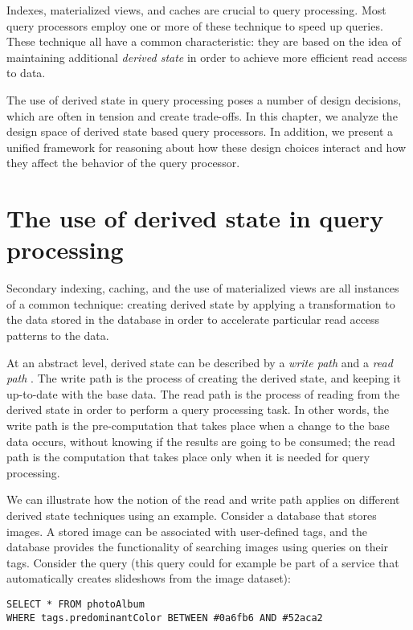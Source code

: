 Indexes, materialized views, and caches are crucial to query processing.
Most query processors employ one or more of these technique to speed up queries.
These technique all have a common characteristic:
they are based on the idea of maintaining additional \textit{derived state} in order to achieve more efficient read
access to data.

The use of derived state in query processing poses a number of design decisions,
which are often in tension and create trade-offs.
In this chapter, we analyze the design space of derived state based query processors.
In addition, we present a unified framework for reasoning about how these design choices interact
and how they affect the behavior of the query processor.


\section{The use of derived state in query processing}
\label{sec:read_write_path}

Secondary indexing, caching, and the use of materialized views are all instances of a common technique:
creating derived state by applying a transformation to the data stored in the database in order to accelerate particular
read access patterns to the data.

At an abstract level, derived state can be described by a \textit{write path} and a \textit{read path}
\cite{kleppmann:designing}.
The write path is the process of creating the derived state, and keeping it up-to-date with the base data.
The read path is the process of reading from the derived state in order to perform a query processing task.
In other words, the write path is the pre-computation that takes place when a change to the base data occurs,
without knowing if the results are going to be consumed;
the read path is the computation that takes place only when it is needed for query processing.

We can illustrate how the notion of the read and write path applies on different derived state techniques using an example.
Consider a database that stores images.
A stored image can be associated with user-defined tags, and the database provides the functionality of searching
images using queries on their tags.
Consider the query (this query could for example be part of a service that automatically creates slideshows from the image dataset):

\begin{lstlisting}[]
SELECT * FROM photoAlbum
WHERE tags.predominantColor BETWEEN #0a6fb6 AND #52aca2
\end{lstlisting}


